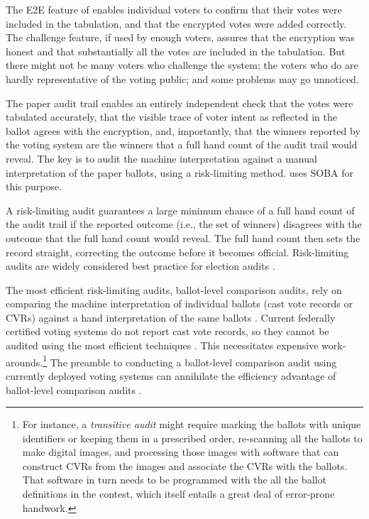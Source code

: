 \label{sec:audit}

The E2E feature of \projname enables individual voters to confirm that their votes were included in the
tabulation, and that the encrypted votes were added correctly.
The challenge feature, if used by enough voters, assures that the encryption was honest
and that substantially all the votes are included in the tabulation.
But there might not be many voters who challenge the system; the voters who do are hardly
representative of the voting public; and some problems may go unnoticed.

The paper audit trail enables an entirely independent check that the votes were tabulated accurately, that
the visible trace of voter intent as reflected in the ballot agrees with the encryption, and, importantly, that
the winners reported by the voting system are the winners that a full hand count of the audit trail would
reveal.
The key is to audit the machine interpretation against a manual interpretation of the paper ballots,
using a risk-limiting method.
\projname uses SOBA \cite{benalohEtal11} for this purpose.

A risk-limiting audit guarantees a large minimum chance of a full hand count of the audit trail if the
reported outcome (i.e., the set of winners) disagrees with the outcome that the full hand count would reveal.
The full hand count then sets the record straight, correcting the outcome before it becomes official.
Risk-limiting audits are widely considered best practice for election audits \cite{bestPractices08}.

The most efficient risk-limiting audits, ballot-level comparison audits, rely on comparing 
the machine interpretation of individual ballots
(cast vote records or CVRs) 
against a hand interpretation of the same ballots \cite{stark10d,benalohEtal11,lindemanStark12}.
Current federally certified voting systems do not report cast vote records, so they cannot
be audited using the most efficient techniques \cite{lindemanStark12,starkWagner12}.
This necessitates expensive work-arounds.\footnote{%
    For instance, a {\em transitive audit\/} might require marking the ballots with unique identifiers
    or keeping them in a prescribed order, re-scanning all the ballots to make digital images,
    and processing those images with software that can construct CVRs from the images and
   associate the CVRs with the ballots.
   That software in turn needs to be programmed with the all the ballot definitions in the contest,
    which itself entails a great deal of error-prone handwork.
}
The preamble to conducting a ballot-level comparison audit using currently deployed voting systems
can annihilate the efficiency advantage of ballot-level comparison
audits \cite{starkWagner12}.

